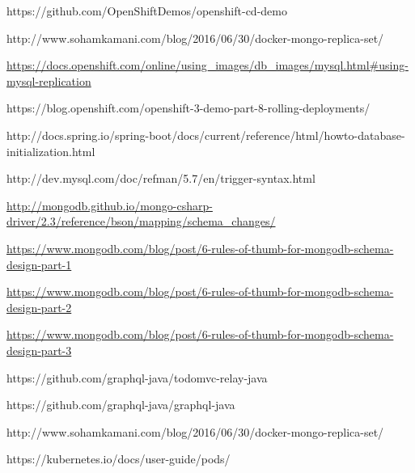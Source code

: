 https://github.com/OpenShiftDemos/openshift-cd-demo

http://www.sohamkamani.com/blog/2016/06/30/docker-mongo-replica-set/

\url{https://docs.openshift.com/online/using_images/db_images/mysql.html#using-mysql-replication}

https://blog.openshift.com/openshift-3-demo-part-8-rolling-deployments/

http://docs.spring.io/spring-boot/docs/current/reference/html/howto-database-initialization.html

http://dev.mysql.com/doc/refman/5.7/en/trigger-syntax.html

\url{http://mongodb.github.io/mongo-csharp-driver/2.3/reference/bson/mapping/schema_changes/}

\url{https://www.mongodb.com/blog/post/6-rules-of-thumb-for-mongodb-schema-design-part-1}

\url{https://www.mongodb.com/blog/post/6-rules-of-thumb-for-mongodb-schema-design-part-2}

\url{https://www.mongodb.com/blog/post/6-rules-of-thumb-for-mongodb-schema-design-part-3}

https://github.com/graphql-java/todomvc-relay-java

https://github.com/graphql-java/graphql-java

http://www.sohamkamani.com/blog/2016/06/30/docker-mongo-replica-set/

https://kubernetes.io/docs/user-guide/pods/









